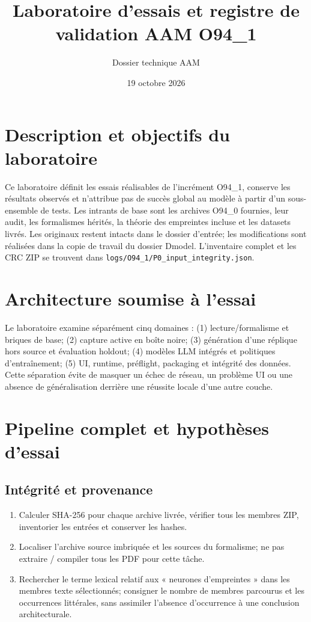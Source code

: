 \documentclass[11pt,a4paper]{article}
\title{Laboratoire d'essais et registre de validation AAM O94\_1}
\author{Dossier technique AAM}
\date{19 octobre 2026}
\begin{document}
\maketitle
\tableofcontents
\newpage

\section{Description et objectifs du laboratoire}
Ce laboratoire définit les essais réalisables de l'incrément O94\_1, conserve les résultats observés et n'attribue pas de succès global au modèle à partir d'un sous-ensemble de tests. Les intrants de base sont les archives O94\_0 fournies, leur audit, les formalismes hérités, la théorie des empreintes incluse et les datasets livrés. Les originaux restent intacts dans le dossier d'entrée; les modifications sont réalisées dans la copie de travail du dossier Dmodel. L'inventaire complet et les CRC ZIP se trouvent dans \texttt{logs/O94\_1/P0\_input\_integrity.json}.

\section{Architecture soumise à l'essai}
Le laboratoire examine séparément cinq domaines : (1) lecture/formalisme et briques de base; (2) capture active en boîte noire; (3) génération d'une réplique hors source et évaluation holdout; (4) modèles LLM intégrés et politiques d'entraînement; (5) UI, runtime, préflight, packaging et intégrité des données. Cette séparation évite de masquer un échec de réseau, un problème UI ou une absence de généralisation derrière une réussite locale d'une autre couche.

\section{Pipeline complet et hypothèses d'essai}
\subsection{Intégrité et provenance}
\begin{enumerate}[nosep]
\item Calculer SHA-256 pour chaque archive livrée, vérifier tous les membres ZIP, inventorier les entrées et conserver les hashes.
\item Localiser l'archive source imbriquée et les sources du formalisme; ne pas extraire / compiler tous les PDF pour cette tâche.
\item Rechercher le terme lexical relatif aux « neurones d'empreintes » dans les membres texte sélectionnés; consigner le nombre de membres parcourus et les occurrences littérales, sans assimiler l'absence d'occurrence à une conclusion architecturale.
\end{enumerate}
\end{document}
